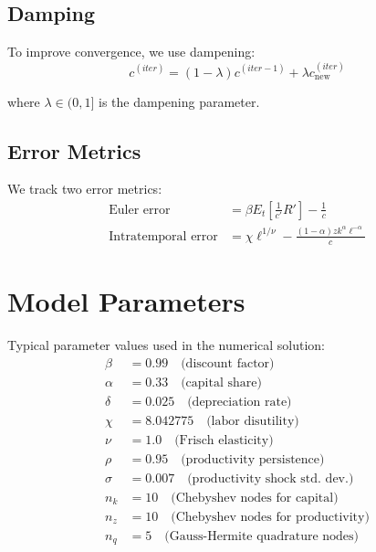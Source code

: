 \documentclass[11pt]{article}
\theoremstyle{definition}
\begin{document}
\subsection{Damping}

To improve convergence, we use dampening:
\begin{equation}
c^{(iter)} = (1-\lambda) c^{(iter-1)} + \lambda c^{(iter)}_{\text{new}}
\end{equation}

where $\lambda \in (0, 1]$ is the dampening parameter.

\subsection{Error Metrics}

We track two error metrics:
\begin{align}
\text{Euler error} &= \beta E_t \left[ \frac{1}{c'} R' \right] - \frac{1}{c} \\
\text{Intratemporal error} &= \chi \ell^{1/\nu} - \frac{(1-\alpha) z k^{\alpha} \ell^{-\alpha}}{c}
\end{align}

\section{Model Parameters}

Typical parameter values used in the numerical solution:
\begin{align}
\beta &= 0.99 \quad \text{(discount factor)} \\
\alpha &= 0.33 \quad \text{(capital share)} \\
\delta &= 0.025 \quad \text{(depreciation rate)} \\
\chi &= 8.042775 \quad \text{(labor disutility)} \\
\nu &= 1.0 \quad \text{(Frisch elasticity)} \\
\rho &= 0.95 \quad \text{(productivity persistence)} \\
\sigma &= 0.007 \quad \text{(productivity shock std. dev.)} \\
n_k &= 10 \quad \text{(Chebyshev nodes for capital)} \\
n_z &= 10 \quad \text{(Chebyshev nodes for productivity)} \\
n_q &= 5 \quad \text{(Gauss-Hermite quadrature nodes)}
\end{align}
\end{document}
